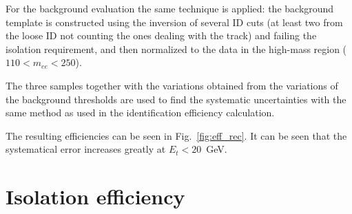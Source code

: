 For the background evaluation the same technique is applied: the background template is constructed using the inversion of several ID cuts (at least two from the loose ID not counting the ones dealing with the track) and failing the isolation requirement, and then normalized to the data in the high-mass region ($110 < m_{ee} < 250$).

The three samples together with the variations obtained from the variations of the background thresholds are used to find the systematic uncertainties with the same method as used in the identification efficiency calculation.

The resulting efficiencies can be seen in Fig.~\ref{fig:eff_rec}. It can be seen that the systematical error increases greatly at $E_{t} < 20$~GeV.

\begin{figure}
\end{figure}

\section{Isolation efficiency}

